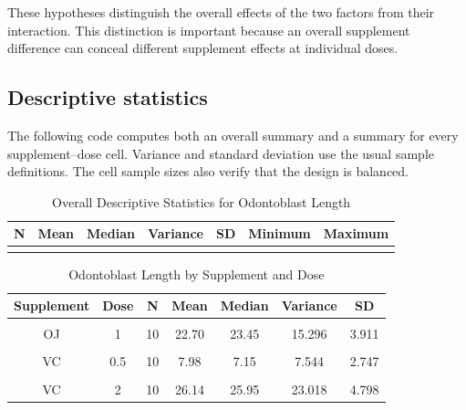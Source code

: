 \documentclass[
  11pt,
]{article}
\begin{document}
These hypotheses distinguish the overall effects of the two factors from
their interaction. This distinction is important because an overall
supplement difference can conceal different supplement effects at
individual doses.

\subsection{Descriptive statistics}\label{descriptive-statistics}

The following code computes both an overall summary and a summary for
every supplement--dose cell. Variance and standard deviation use the
usual sample definitions. The cell sample sizes also verify that the
design is balanced.

\begin{table}[!h]
\centering
\caption{\label{tab:toothgrowth-descriptive-tables}Overall Descriptive Statistics for Odontoblast Length}
\centering
\fontsize{10}{12}\selectfont
\begin{tabular}[t]{ccccccc}
\toprule
\textbf{N} & \textbf{Mean} & \textbf{Median} & \textbf{Variance} & \textbf{SD} & \textbf{Minimum} & \textbf{Maximum}\\
\midrule
\cellcolor{gray!10}{60} & \cellcolor{gray!10}{18.813} & \cellcolor{gray!10}{19.25} & \cellcolor{gray!10}{58.512} & \cellcolor{gray!10}{7.649} & \cellcolor{gray!10}{4.2} & \cellcolor{gray!10}{33.9}\\
\bottomrule
\end{tabular}
\end{table}

\begin{table}[!h]
\centering
\caption{\label{tab:toothgrowth-cell-summary}Odontoblast Length by Supplement and Dose}
\centering
\fontsize{10}{12}\selectfont
\begin{tabular}[t]{ccccccc}
\toprule
\textbf{Supplement} & \textbf{Dose} & \textbf{N} & \textbf{Mean} & \textbf{Median} & \textbf{Variance} & \textbf{SD}\\
\midrule
\cellcolor{gray!10}{OJ} & \cellcolor{gray!10}{0.5} & \cellcolor{gray!10}{10} & \cellcolor{gray!10}{13.23} & \cellcolor{gray!10}{12.25} & \cellcolor{gray!10}{19.889} & \cellcolor{gray!10}{4.460}\\
OJ & 1 & 10 & 22.70 & 23.45 & 15.296 & 3.911\\
\cellcolor{gray!10}{OJ} & \cellcolor{gray!10}{2} & \cellcolor{gray!10}{10} & \cellcolor{gray!10}{26.06} & \cellcolor{gray!10}{25.95} & \cellcolor{gray!10}{7.049} & \cellcolor{gray!10}{2.655}\\
VC & 0.5 & 10 & 7.98 & 7.15 & 7.544 & 2.747\\
\cellcolor{gray!10}{VC} & \cellcolor{gray!10}{1} & \cellcolor{gray!10}{10} & \cellcolor{gray!10}{16.77} & \cellcolor{gray!10}{16.50} & \cellcolor{gray!10}{6.327} & \cellcolor{gray!10}{2.515}\\
\addlinespace
VC & 2 & 10 & 26.14 & 25.95 & 23.018 & 4.798\\
\bottomrule
\end{tabular}
\end{table}
\end{document}
